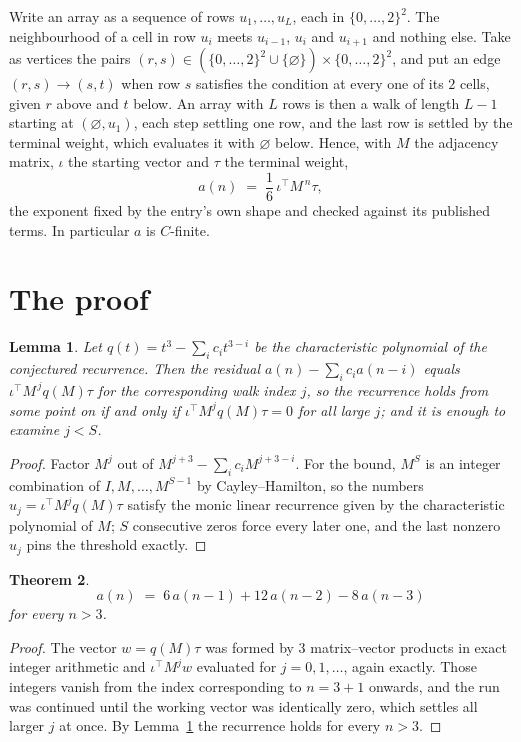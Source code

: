 \documentclass[11pt,a4paper]{article}
\theoremstyle{plain}
\newtheorem{theorem}{Theorem}
\newtheorem{lemma}[theorem]{Lemma}
\theoremstyle{definition}
\begin{document}
Write an array as a sequence of rows $u_1,\dots,u_L$, each in
$\{0,\dots,2\}^{2}$. The neighbourhood of a cell in row $u_i$ meets $u_{i-1}$,
$u_i$ and $u_{i+1}$ and nothing else. Take as vertices the pairs
$(r,s)\in(\{0,\dots,2\}^{2}\cup\{\varnothing\})\times\{0,\dots,2\}^{2}$,
and put an edge $(r,s)\to(s,t)$ when row $s$ satisfies the condition at every one of its
$2$ cells, given $r$ above and $t$ below. An array with $L$ rows is then a walk of length
$L-1$ starting at $(\varnothing,u_1)$, each step settling one row, and the last row is
settled by the terminal weight, which evaluates it with $\varnothing$ below. Hence,
with $M$ the adjacency matrix, $\iota$ the starting vector and $\tau$ the terminal weight,
\[
a(n)\;=\;\frac{1}{6}\,\iota^{\!\top}M^{\,n}\tau ,
\]
the exponent fixed by the entry's own shape and checked against its published terms. In
particular $a$ is $C$-finite.

\section{The proof}

\begin{lemma}\label{lem:crit}
Let $q(t)=t^{3}-\sum_i c_it^{3-i}$ be the characteristic polynomial of the
conjectured recurrence. Then the residual $a(n)-\sum_ic_ia(n-i)$ equals
$\iota^{\!\top}M^{\,j}q(M)\tau$ for the corresponding walk index $j$, so the
recurrence holds from some point on if and only if $\iota^{\!\top}M^{j}q(M)\tau=0$ for all
large $j$; and it is enough to examine $j<S$.
\end{lemma}

\begin{proof}
Factor $M^{j}$ out of $M^{j+3}-\sum_ic_iM^{j+3-i}$. For the bound, $M^{S}$
is an integer combination of $I,M,\dots,M^{S-1}$ by Cayley--Hamilton, so the numbers
$u_j=\iota^{\!\top}M^{j}q(M)\tau$ satisfy the monic linear recurrence given by the
characteristic polynomial of $M$; $S$ consecutive zeros force every later one, and the last
nonzero $u_j$ pins the threshold exactly.
\end{proof}

\begin{theorem}
\[
a(n)\;=\;6\,a(n-1) + 12\,a(n-2) - 8\,a(n-3)
\]
for every $n>3$.
\end{theorem}

\begin{proof}
The vector $w=q(M)\tau$ was formed by $3$ matrix--vector products in exact integer
arithmetic and $\iota^{\!\top}M^{j}w$ evaluated for $j=0,1,\dots$, again exactly. Those
integers vanish from the index corresponding to $n=3+1$ onwards, and the run was
continued until the working vector was identically zero, which settles all larger $j$ at once.
By Lemma~\ref{lem:crit} the recurrence holds for every $n>3$.
\end{proof}
\end{document}
